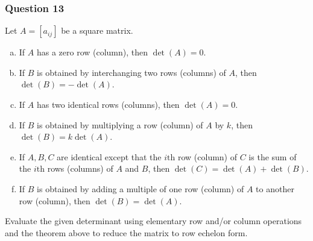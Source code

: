 \documentclass{math}
\begin{document}
\subsubsection*{Question 13}
Let \( A = [a_{ij}] \) be a square matrix.
\begin{enumerate}[a.]
  \item If \( A \) has a zero row (column), then \( \det(A) = 0 \).
  \item If \( B \) is obtained by interchanging two rows (columns) of \( A \),
    then \( \det(B) = -\det(A) \).
  \item If \( A \) has two identical rows (columns), then \( \det(A) = 0 \).
  \item If \( B \) is obtained by multiplying a row (column) of \( A \) by
    \( k \), then \( \det(B) = k\det(A) \).
  \item If \( A,B,C \) are identical except that the \( i\text{th} \) row
    (column) of \( C \) is the sum of the \( i\text{th} \) rows (columns) of
    \( A \) and \( B \), then \( \det(C) = \det(A)+\det(B) \).
  \item If \( B \) is obtained by adding a multiple of one row (column) of
    \( A \) to another row (column), then \( \det(B) = \det(A) \).
\end{enumerate}
Evaluate the given determinant using elementary row and/or column operations and
the theorem above to reduce the matrix to row echelon form.
\end{document}
